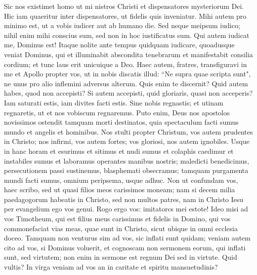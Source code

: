 \begin{biblechapter} 
\verse Sic nos existimet homo ut mi nistros Christi et dispensatores mysteriorum Dei. 
\verse Hic iam quaeritur inter dispensatores, ut fidelis quis inveniatur. 
\verse Mihi autem pro minimo est, ut a vobis iudicer aut ab humano die. Sed neque meipsum iudico;  
\verse nihil enim mihi conscius sum, sed non in hoc iustificatus sum. Qui autem iudicat me, Dominus est! 
\verse Itaque nolite ante tempus quidquam iudicare, quoadusque veniat Dominus, qui et illuminabit abscondita tenebrarum et manifestabit consilia cordium; et tunc laus erit unicuique a Deo. 
\verse Haec autem, fratres, transfiguravi in me et Apollo propter vos, ut in nobis discatis illud: “Ne supra quae scripta sunt", ne unus pro alio inflemini adversus alterum. 
\verse Quis enim te discernit? Quid autem habes, quod non accepisti? Si autem accepisti, quid gloriaris, quasi non acceperis? 
\verse Iam saturati estis, iam divites facti estis. Sine nobis regnastis; et utinam regnaretis, ut et nos vobiscum regnaremus. 
\verse Puto enim, Deus nos apostolos novissimos ostendit tamquam morti destinatos, quia spectaculum facti sumus mundo et angelis et hominibus. 
\verse Nos stulti propter Christum, vos autem prudentes in Christo; nos infirmi, vos autem fortes; vos gloriosi, nos autem ignobiles.  
\verse Usque in hanc horam et esurimus et sitimus et nudi sumus et colaphis caedimur et instabiles sumus 
\verse et laboramus operantes manibus nostris; maledicti benedicimus, persecutionem passi sustinemus, 
\verse blasphemati obsecramus; tamquam purgamenta mundi facti sumus, omnium peripsema, usque adhuc. 
\verse Non ut confundam vos, haec scribo, sed ut quasi filios meos carissimos moneam; 
\verse nam si decem milia paedagogorum habeatis in Christo, sed non multos patres, nam in Christo Iesu per evangelium ego vos genui. 
\verse Rogo ergo vos: imitatorcs mei estote! 
\verse Ideo misi ad vos Timotheum, qui est filius meus carissimus et fidelis in Domino, qui vos commonefaciat vias meas, quae sunt in Christo, sicut ubique in omni ecclesia doceo. 
\verse Tamquam non venturus sim ad vos, sic inflati sunt quidam; 
\verse veniam autem cito ad vos, si Dominus voluerit, et cognoscam non sermonem eorum, qui inflati sunt, sed virtutem; 
\verse non enim in sermone est regnum Dei sed in virtute.  
\verse Quid vultis? In virga veniam ad vos an in caritate et spiritu mansuetudinis? 
\end{biblechapter}

